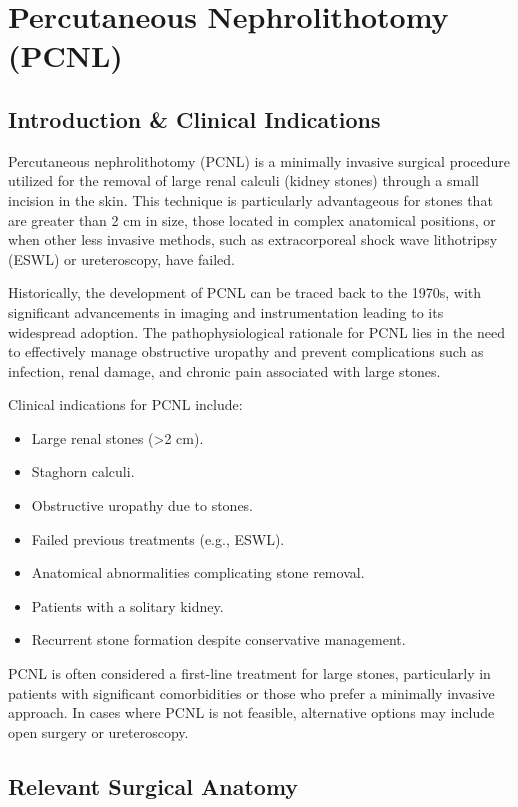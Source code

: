 \chapter{Percutaneous Nephrolithotomy (PCNL)}

\section*{Introduction \& Clinical Indications}

Percutaneous nephrolithotomy (PCNL) is a minimally invasive surgical procedure utilized for the removal of large renal calculi (kidney stones) through a small incision in the skin. This technique is particularly advantageous for stones that are greater than 2 cm in size, those located in complex anatomical positions, or when other less invasive methods, such as extracorporeal shock wave lithotripsy (ESWL) or ureteroscopy, have failed. 

Historically, the development of PCNL can be traced back to the 1970s, with significant advancements in imaging and instrumentation leading to its widespread adoption. The pathophysiological rationale for PCNL lies in the need to effectively manage obstructive uropathy and prevent complications such as infection, renal damage, and chronic pain associated with large stones.

Clinical indications for PCNL include:

\begin{itemize}
    \item Large renal stones (>2 cm).
    \item Staghorn calculi.
    \item Obstructive uropathy due to stones.
    \item Failed previous treatments (e.g., ESWL).
    \item Anatomical abnormalities complicating stone removal.
    \item Patients with a solitary kidney.
    \item Recurrent stone formation despite conservative management.
\end{itemize}

PCNL is often considered a first-line treatment for large stones, particularly in patients with significant comorbidities or those who prefer a minimally invasive approach. In cases where PCNL is not feasible, alternative options may include open surgery or ureteroscopy.

\section*{Relevant Surgical Anatomy}

